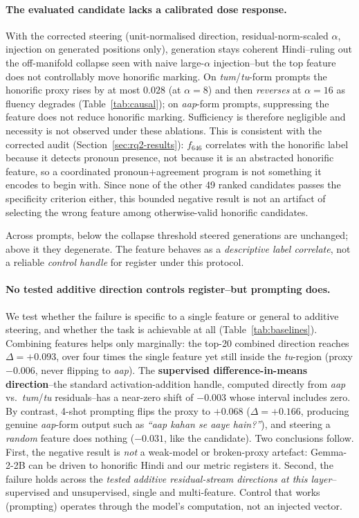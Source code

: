 \documentclass[11pt]{article}
\newcommand{\aap}{\textit{aap}}
\newcommand{\tum}{\textit{tum}}
\newcommand{\tu}{\textit{tu}}
\begin{document}
\paragraph{The evaluated candidate lacks a calibrated dose response.}
With the corrected steering (unit-normalised direction, residual-norm-scaled
$\alpha$, injection on generated positions only), generation stays coherent
Hindi--ruling out the off-manifold collapse seen with naive large-$\alpha$
injection--but the top feature does not controllably move honorific marking.
On \tum/\tu-form prompts the honorific proxy rises by at most $0.028$ (at
$\alpha{=}8$) and then \emph{reverses} at $\alpha{=}16$ as fluency degrades
(Table~\ref{tab:causal}); on \aap-form prompts, suppressing the feature does not
reduce honorific marking. Sufficiency is therefore negligible and necessity is
not observed under these ablations. This is consistent with the corrected audit
(Section~\ref{sec:rq2-results}): $f_{646}$ correlates with the honorific label
because it detects pronoun presence, not because it is an abstracted honorific
feature, so a coordinated pronoun${+}$agreement program is not something it
encodes to begin with. Since none of the other 49 ranked candidates passes the
specificity criterion either, this bounded negative result is not an artifact
of selecting the wrong feature among otherwise-valid honorific candidates.


Across prompts, below the collapse threshold steered generations are unchanged;
above it they degenerate. The feature behaves as a \emph{descriptive label
correlate}, not a reliable \emph{control handle} for register under this protocol.

\paragraph{No tested additive direction controls register--but prompting does.}
We test whether the failure is specific to a single feature or general to
additive steering, and whether the task is achievable at all
(Table~\ref{tab:baselines}). Combining features helps only marginally: the
top-20 combined direction reaches $\Delta = +0.093$, over four times the single
feature yet still inside the \tu-region (proxy $-0.006$, never flipping to
\aap). The \textbf{supervised difference-in-means direction}--the standard
activation-addition handle, computed directly from \aap{} vs.\ \tum/\tu{}
residuals--has a near-zero shift of $-0.003$ whose interval includes zero. By
contrast, 4-shot prompting flips the proxy to $+0.068$ ($\Delta = +0.166$,
producing genuine
\aap-form output such as \textit{``aap kahan se aaye hain?''}), and steering a
\emph{random} feature does nothing ($-0.031$, like the candidate). Two
conclusions follow. First, the negative result is \emph{not} a weak-model or
broken-proxy artefact: Gemma-2-2B can be driven to honorific Hindi and our
metric registers it. Second, the failure holds across the \emph{tested additive
residual-stream directions at this layer}--supervised and unsupervised, single
and multi-feature. Control
that works (prompting) operates through the model's computation, not an injected
vector.
\end{document}
